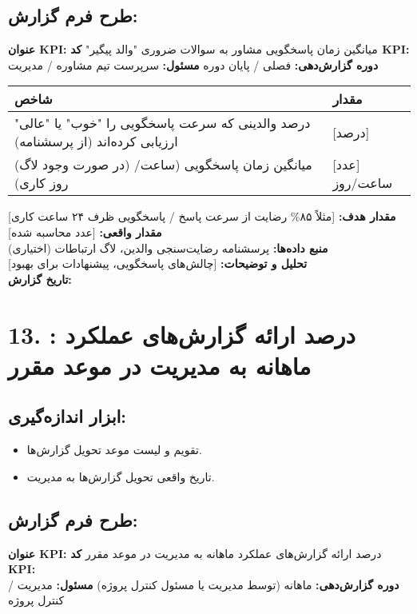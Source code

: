 \documentclass[11pt]{article}
\begin{document}
\subsection*{طرح فرم گزارش:}
\noindent\textbf{عنوان KPI:} میانگین زمان پاسخگویی مشاور به سوالات ضروری "والد پیگیر" \hfill \textbf{کد KPI:}  \\
\noindent\textbf{دوره گزارش‌دهی:} فصلی / پایان دوره \hfill \textbf{مسئول:} سرپرست تیم مشاوره / مدیریت \\

\bigskip
\begin{tabular}{ll}
\textbf{شاخص} & \textbf{مقدار} \\
\hline
درصد والدینی که سرعت پاسخگویی را "خوب" یا "عالی" ارزیابی کرده‌اند (از پرسشنامه) & {[درصد]} \\
(در صورت وجود لاگ) میانگین زمان پاسخگویی (ساعت/روز کاری) & {[عدد] ساعت/روز} \\
\end{tabular}
\bigskip

\noindent\textbf{مقدار هدف:} {[مثلاً ۸۵\% رضایت از سرعت پاسخ / پاسخگویی ظرف ۲۴ ساعت کاری]} \hfill \textbf{مقدار واقعی:} {[عدد محاسبه شده]} \\
\noindent\textbf{منبع داده‌ها:} پرسشنامه رضایت‌سنجی والدین، لاگ ارتباطات (اختیاری) \\
\noindent\textbf{تحلیل و توضیحات:} {[چالش‌های پاسخگویی، پیشنهادات برای بهبود]} \\
\noindent\textbf{تاریخ گزارش:} \\

\hrulefill
\bigskip

\section*{13. : درصد ارائه گزارش‌های عملکرد ماهانه به مدیریت در موعد مقرر}

\subsection*{ابزار اندازه‌گیری:}
\begin{itemize}
    \item تقویم و لیست موعد تحویل گزارش‌ها.
    \item تاریخ واقعی تحویل گزارش‌ها به مدیریت.
\end{itemize}

\subsection*{طرح فرم گزارش:}
\noindent\textbf{عنوان KPI:} درصد ارائه گزارش‌های عملکرد ماهانه به مدیریت در موعد مقرر \hfill \textbf{کد KPI:}  \\
\noindent\textbf{دوره گزارش‌دهی:} ماهانه (توسط مدیریت یا مسئول کنترل پروژه) \hfill \textbf{مسئول:} مدیریت / کنترل پروژه \\
\end{document}
